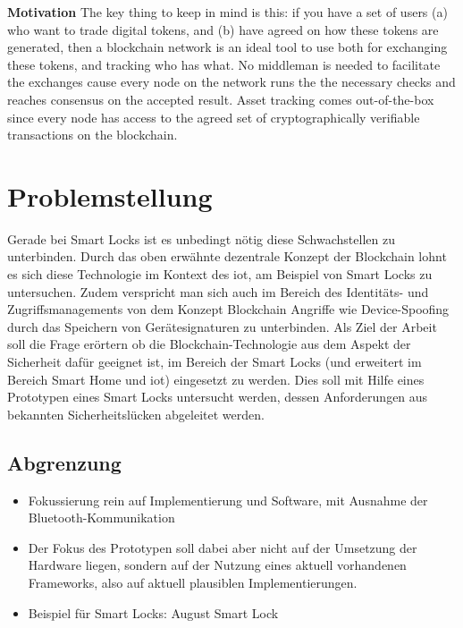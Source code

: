     \noindent\textbf{Motivation}\newline
    The key thing to keep in mind is this: if you have a set of users (a) who want to trade digital tokens, and (b) have agreed on how these tokens are generated, then a blockchain network is an ideal tool to use both for exchanging these tokens, and tracking who has what. No middleman is needed to facilitate the exchanges cause every node on the network runs the the necessary checks and reaches consensus on the accepted result. Asset tracking comes out-of-the-box since every node has access to the agreed set of cryptographically verifiable transactions on the blockchain.\cite{Christidis2016}
    \newline\smallskip
    
\section{Problemstellung}
\label{sec:problem}
    Gerade bei Smart Locks ist es unbedingt nötig diese Schwachstellen zu unterbinden.
    Durch das oben erwähnte dezentrale Konzept der Blockchain\cite{Nakamoto2008} lohnt es sich diese Technologie im Kontext des \gls{iot}, am Beispiel von Smart Locks zu untersuchen.
    Zudem verspricht man sich auch im Bereich des Identitäts- und Zugriffsmanagements von dem Konzept Blockchain Angriffe wie Device-Spoofing durch das Speichern von Gerätesignaturen zu unterbinden\cite{Kshetri2017}.
    \newline
    \noindent Als Ziel der Arbeit soll die Frage erörtern ob die Block\-chain\--Tech\-no\-lo\-gie aus dem Aspekt der Sicherheit dafür geeignet ist, im Bereich der Smart Locks (und erweitert im Bereich Smart Home und \gls{iot}) eingesetzt zu werden.
    Dies soll mit Hilfe eines Prototypen eines Smart Locks untersucht werden, dessen Anforderungen aus bekannten Sicherheitslücken abgeleitet werden.
    
    
    \subsection{Abgrenzung}
    \label{sec:problem_limit}
    	\begin{itemize}
    		\item Fokussierung rein auf Implementierung und Software, mit Ausnahme der Bluetooth-Kommunikation
    		\item Der Fokus des Prototypen soll dabei aber nicht auf der Umsetzung der Hardware liegen, sondern auf der Nutzung eines aktuell vorhandenen Frameworks, also auf aktuell plausiblen Implementierungen. 
    		\item Beispiel für Smart Locks: August Smart Lock
    	\end{itemize}

